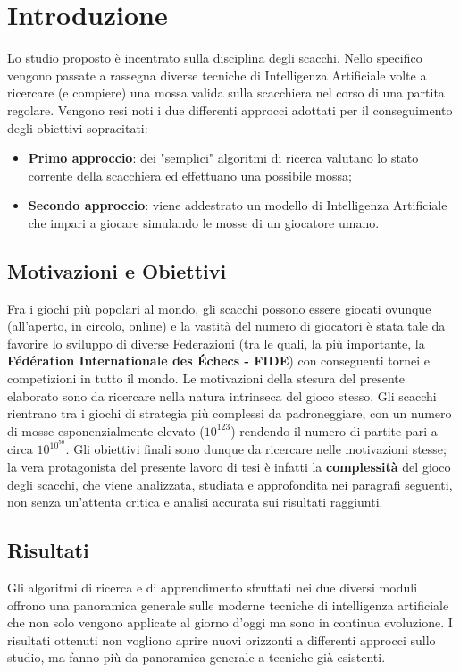\chapter{Introduzione}
Lo studio proposto è incentrato sulla disciplina degli scacchi. Nello specifico vengono passate a rassegna diverse tecniche di 
Intelligenza Artificiale volte a ricercare (e compiere) una mossa valida sulla scacchiera nel corso di una partita regolare.
Vengono resi noti i due differenti approcci adottati per il conseguimento degli obiettivi sopracitati: 
\begin{itemize}
    \item \textbf{Primo approccio}: dei "semplici" algoritmi di ricerca valutano lo stato corrente della scacchiera ed effettuano una 
    possibile mossa;
    \item \textbf{Secondo approccio}: viene addestrato un modello di Intelligenza Artificiale che impari a giocare simulando le 
    mosse di un giocatore umano. 
\end{itemize}

\section{Motivazioni e Obiettivi} %
Fra i giochi più popolari al mondo, gli scacchi possono essere giocati ovunque (all'aperto, in circolo, online) e la vastità del numero di 
giocatori è stata tale da favorire lo sviluppo di diverse Federazioni (tra le quali, la più importante, la 
\textbf{Fédération Internationale des Échecs - FIDE}) con conseguenti tornei e competizioni in tutto il mondo. 
Le motivazioni della stesura del presente elaborato sono da ricercare nella natura intrinseca del gioco stesso. Gli scacchi rientrano
tra i giochi di strategia più complessi da padroneggiare, con un numero di mosse esponenzialmente elevato ($10^{123}$) rendendo il numero 
di partite pari a circa $10^{10^{50}}$. Gli obiettivi finali sono dunque da ricercare nelle motivazioni stesse; la vera protagonista del
presente lavoro di tesi è infatti la \textbf{complessità} del gioco degli scacchi, che viene analizzata, studiata e approfondita nei paragrafi
seguenti, non senza un'attenta critica e analisi accurata sui risultati raggiunti.

\section{Risultati}
Gli algoritmi di ricerca e di apprendimento sfruttati nei due diversi moduli offrono una panoramica generale sulle moderne tecniche di intelligenza
artificiale che non solo vengono applicate al giorno d'oggi ma sono in continua evoluzione. I risultati ottenuti non vogliono aprire nuovi
orizzonti a differenti approcci sullo studio, ma fanno più da panoramica generale a tecniche già esistenti.

